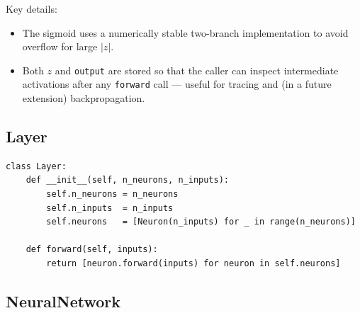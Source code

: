 \documentclass[12pt,a4paper]{article}
\begin{document}
Key details:
\begin{itemize}
    \item The sigmoid uses a numerically stable two-branch implementation to
          avoid overflow for large $|z|$.
    \item Both $z$ and \texttt{output} are stored so that the caller can
          inspect intermediate activations after any \texttt{forward} call ---
          useful for tracing and (in a future extension) backpropagation.
\end{itemize}

\subsection{Layer}

\begin{lstlisting}[caption={Layer class}]
class Layer:
    def __init__(self, n_neurons, n_inputs):
        self.n_neurons = n_neurons
        self.n_inputs  = n_inputs
        self.neurons   = [Neuron(n_inputs) for _ in range(n_neurons)]

    def forward(self, inputs):
        return [neuron.forward(inputs) for neuron in self.neurons]
\end{lstlisting}

\subsection{NeuralNetwork}
\end{document}
